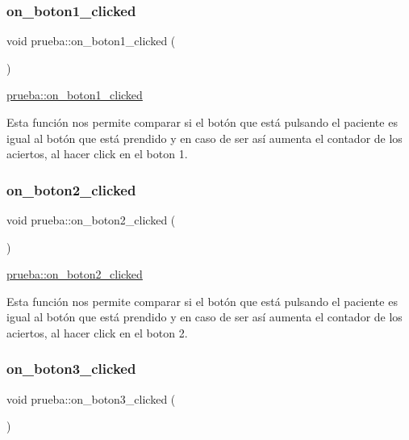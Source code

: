 \subsubsection{\texorpdfstring{on\+\_\+boton1\+\_\+clicked}{on\_boton1\_clicked}}
{\footnotesize\ttfamily void prueba\+::on\+\_\+boton1\+\_\+clicked (\begin{DoxyParamCaption}{ }\end{DoxyParamCaption})\hspace{0.3cm}{\ttfamily [slot]}}



\hyperlink{classprueba_a09d5326f33ef9cfafd86237e733c1093}{prueba\+::on\+\_\+boton1\+\_\+clicked} 

Esta función nos permite comparar si el botón que está pulsando el paciente es igual al botón que está prendido y en caso de ser así aumenta el contador de los aciertos, al hacer click en el boton 1. \mbox{\label{classprueba_ae81b6c5c5782c2348f88bdb0f34b163f}} 
\subsubsection{\texorpdfstring{on\+\_\+boton2\+\_\+clicked}{on\_boton2\_clicked}}
{\footnotesize\ttfamily void prueba\+::on\+\_\+boton2\+\_\+clicked (\begin{DoxyParamCaption}{ }\end{DoxyParamCaption})\hspace{0.3cm}{\ttfamily [slot]}}



\hyperlink{classprueba_ae81b6c5c5782c2348f88bdb0f34b163f}{prueba\+::on\+\_\+boton2\+\_\+clicked} 

Esta función nos permite comparar si el botón que está pulsando el paciente es igual al botón que está prendido y en caso de ser así aumenta el contador de los aciertos, al hacer click en el boton 2. \mbox{\label{classprueba_a622258b2f43536c572613dc4bc3e4e65}} 
\subsubsection{\texorpdfstring{on\+\_\+boton3\+\_\+clicked}{on\_boton3\_clicked}}
{\footnotesize\ttfamily void prueba\+::on\+\_\+boton3\+\_\+clicked (\begin{DoxyParamCaption}{ }\end{DoxyParamCaption})\hspace{0.3cm}{\ttfamily [slot]}}



